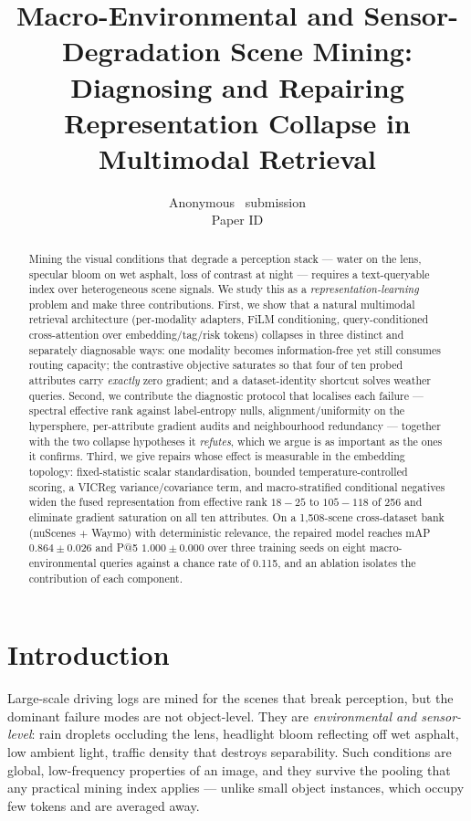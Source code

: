 \documentclass[10pt,twocolumn,letterpaper]{article}
\title{Macro-Environmental and Sensor-Degradation Scene Mining:\\
Diagnosing and Repairing Representation Collapse in Multimodal Retrieval}
\author{Anonymous \confName\ submission\\ Paper ID \paperID}
\begin{document}
\maketitle

\begin{abstract}
Mining the visual conditions that degrade a perception stack --- water on
the lens, specular bloom on wet asphalt, loss of contrast at night ---
requires a text-queryable index over heterogeneous scene signals. We study
this as a \emph{representation-learning} problem and make three
contributions. First, we show that a natural multimodal retrieval
architecture (per-modality adapters, FiLM conditioning, query-conditioned
cross-attention over embedding/tag/risk tokens) collapses in three
distinct and separately diagnosable ways: one modality becomes
information-free yet still consumes routing capacity; the contrastive
objective saturates so that four of ten probed attributes carry
\emph{exactly} zero gradient; and a dataset-identity shortcut solves
weather queries. Second, we contribute the diagnostic protocol that
localises each failure --- spectral effective rank against label-entropy
nulls, alignment/uniformity on the hypersphere, per-attribute gradient
audits and neighbourhood redundancy --- together with the two collapse
hypotheses it \emph{refutes}, which we argue is as important as the ones
it confirms. Third, we give repairs whose effect is measurable in the
embedding topology: fixed-statistic scalar standardisation, bounded
temperature-controlled scoring, a VICReg variance/covariance term, and
macro-stratified conditional negatives widen the fused representation from
effective rank $18\!-\!25$ to $105\!-\!118$ of 256 and eliminate gradient
saturation on all ten attributes. On a 1{,}508-scene cross-dataset bank
(nuScenes $+$ Waymo) with deterministic relevance, the repaired model
reaches mAP $0.864\!\pm\!0.026$ and P@5 $1.000\!\pm\!0.000$ over three
training seeds on eight macro-environmental queries against a chance rate of
0.115, and an ablation isolates the contribution of each component.
\end{abstract}

\section{Introduction}
\label{sec:intro}
Large-scale driving logs are mined for the scenes that break perception,
but the dominant failure modes are not object-level. They are
\emph{environmental and sensor-level}: rain droplets occluding the lens,
headlight bloom reflecting off wet asphalt, low ambient light, traffic
density that destroys separability. Such conditions are global,
low-frequency properties of an image, and they survive the pooling that
any practical mining index applies --- unlike small object instances,
which occupy few tokens and are averaged away.
\end{document}
